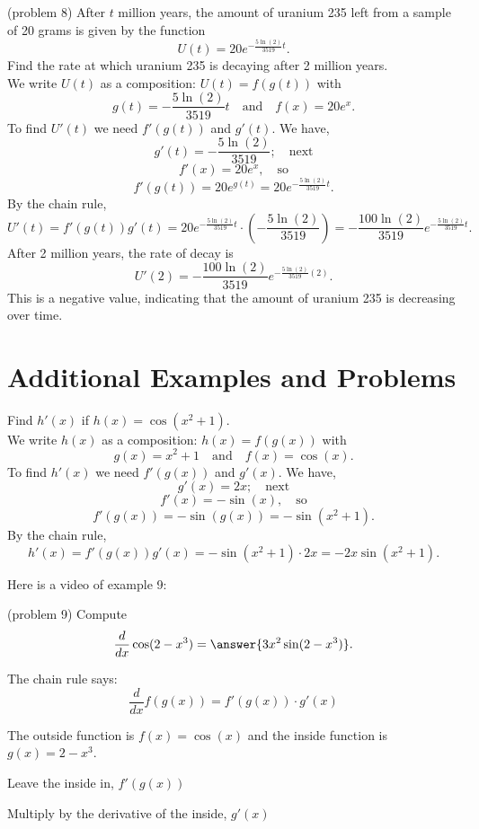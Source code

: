 \documentclass[handout]{ximera}
\begin{document}
\begin{problem}(problem 8)
After $t$ million years, the amount of uranium 235 left from a sample of 20 grams is given by the function
\[
U(t) = 20e^{-\frac{5\ln(2)}{3519}t}.
\]
Find the rate at which uranium 235 is decaying after 2 million years.\\
We write $U(t)$ as a composition: $U(t) = f(g(t))$ with
\[
g(t) = -\frac{5\ln(2)}{3519}t  \quad \text{and} \quad  f(x) = 20e^x.
\]
To find $U'(t)$ we need $f'(g(t))$ and $g'(t)$. We have,
\[
g'(t) = -\frac{5\ln(2)}{3519}; \quad \text{next}
\]
\[
f'(x) = 20e^x, \quad \text{so}
\]
\[
f'(g(t))= 20e^{g(t)} = 20e^{-\frac{5\ln(2)}{3519}t}.
\]
By the chain rule,
\[
U'(t) = f'(g(t))g'(t) = 20e^{-\frac{5\ln(2)}{3519}t} \cdot \left(-\frac{5\ln(2)}{3519}\right) = -\frac{100\ln(2)}{3519}e^{-\frac{5\ln(2)}{3519}t}.
\]
After 2 million years, the rate of decay is
\[
U'(2) = -\frac{100\ln(2)}{3519}e^{-\frac{5\ln(2)}{3519}(2)}.
\]
This is a negative value, indicating that the amount of uranium 235 is decreasing over time.
\end{problem}

\section{Additional Examples and Problems}


\begin{example}[example 9]
Find $h'(x)$ if $h(x) = \cos(x^2 + 1)$.\\
We write $h(x)$ as a composition: $h(x)=f(g(x))$ with
\[
g(x) = x^2 + 1  \quad \text{and} \quad  f(x) = \cos(x).
\]
To find $h'(x)$ we need $f'(g(x))$ and $g'(x)$. We have,
\[
g'(x) = 2x; \quad \text{next}
\]
\[
f'(x) = -\sin(x), \quad \text{so}
\]
\[
f'(g(x))= -\sin(g(x)) = -\sin(x^2 + 1).
\]
By the chain rule,
\[
h'(x) = f'(g(x))g'(x) = -\sin(x^2 + 1) \cdot 2x = -2x\sin(x^2 + 1).
\]

\end{example}

Here is a video of  example 9:
\begin{foldable}%
\end{foldable}


\begin{problem}(problem 9)
  Compute
  \[
  \frac{d}{dx} \cos(2-x^3) = \answer{3x^2\sin(2-x^3)}.
  \]
  
    \begin{hint}
      The chain rule says:
      \[
      \frac{d}{dx} f(g(x)) = f'(g(x))\cdot g'(x)
      \]
    \end{hint}
    \begin{hint}
      The outside function is $f(x) = \cos(x)$ and the inside
      function is $g(x) = 2-x^3$.
    \end{hint}
    \begin{hint}
		  Leave the inside in, $f'(g(x))$
		\end{hint}
		\begin{hint}
		  Multiply by the derivative of the inside, $g'(x)$
		\end{hint}
    
\end{problem}
\end{document}
